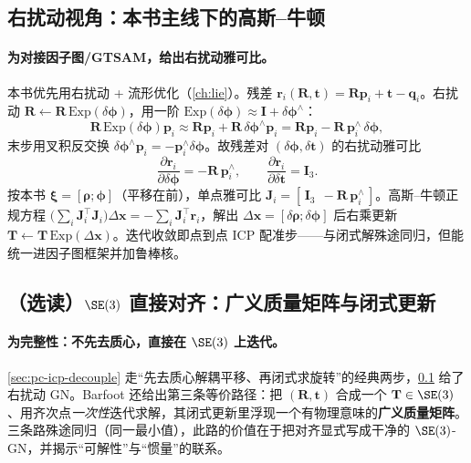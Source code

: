 \subsection{右扰动视角：本书主线下的高斯--牛顿}
\label{sec:pc-icp-rightpert}

\paragraph{为对接因子图/GTSAM，给出右扰动雅可比。}
本书优先用右扰动 + 流形优化（\cref{ch:lie}）。残差 $\mathbf{r}_i(\mathbf{R},\mathbf{t})=\mathbf{R}\mathbf{p}_i+\mathbf{t}-\mathbf{q}_i$。右扰动 $\mathbf{R}\leftarrow\mathbf{R}\,\mathrm{Exp}(\delta\boldsymbol{\phi})$，用一阶 $\mathrm{Exp}(\delta\boldsymbol{\phi})\approx\mathbf{I}+\delta\boldsymbol{\phi}^\wedge$：
\begin{equation}
  \mathbf{R}\,\mathrm{Exp}(\delta\boldsymbol{\phi})\mathbf{p}_i\approx\mathbf{R}\mathbf{p}_i+\mathbf{R}\,\delta\boldsymbol{\phi}^\wedge\mathbf{p}_i
  =\mathbf{R}\mathbf{p}_i-\mathbf{R}\,\mathbf{p}_i^\wedge\,\delta\boldsymbol{\phi},
\end{equation}
末步用叉积反交换 $\delta\boldsymbol{\phi}^\wedge\mathbf{p}_i=-\mathbf{p}_i^\wedge\delta\boldsymbol{\phi}$。故残差对 $(\delta\boldsymbol{\phi},\delta\mathbf{t})$ 的右扰动雅可比
\begin{equation}
  \frac{\partial\mathbf{r}_i}{\partial\delta\boldsymbol{\phi}}=-\mathbf{R}\,\mathbf{p}_i^\wedge,\qquad
  \frac{\partial\mathbf{r}_i}{\partial\delta\mathbf{t}}=\mathbf{I}_3.
  \label{eq:pc-icp-jac}
\end{equation}
按本书 $\boldsymbol{\xi}=[\boldsymbol{\rho};\boldsymbol{\phi}]$（平移在前），单点雅可比 $\mathbf{J}_i=[\,\mathbf{I}_3\ \ -\mathbf{R}\,\mathbf{p}_i^\wedge\,]$。高斯--牛顿正规方程 $\big(\sum_i\mathbf{J}_i^\top\mathbf{J}_i\big)\Delta\mathbf{x}=-\sum_i\mathbf{J}_i^\top\mathbf{r}_i$，解出 $\Delta\mathbf{x}=[\delta\boldsymbol{\rho};\delta\boldsymbol{\phi}]$ 后右乘更新 $\mathbf{T}\leftarrow\mathbf{T}\,\mathrm{Exp}(\Delta\mathbf{x})$。迭代收敛即点到点 ICP 配准步——与闭式解殊途同归，但能统一进因子图框架并加鲁棒核。

\subsection{（选读）\texorpdfstring{$\SE(3)$}{SE(3)} 直接对齐：广义质量矩阵与闭式更新}
\label{sec:pc-icp-se3align}

\paragraph{为完整性：不先去质心，直接在 \texorpdfstring{$\SE(3)$}{SE(3)} 上迭代。}
\cref{sec:pc-icp-decouple} 走“先去质心解耦平移、再闭式求旋转”的经典两步，\cref{sec:pc-icp-rightpert} 给了右扰动 GN。Barfoot\cite{barfoot2024state} 还给出第三条等价路径：把 $(\mathbf{R},\mathbf{t})$ 合成一个 $\mathbf{T}\in\SE(3)$、用齐次点\emph{一次性}迭代求解，其闭式更新里浮现一个有物理意味的\textbf{广义质量矩阵}。三条路殊途同归（同一最小值），此路的价值在于把对齐显式写成干净的 $\SE(3)$-GN，并揭示“可解性”与“惯量”的联系。

